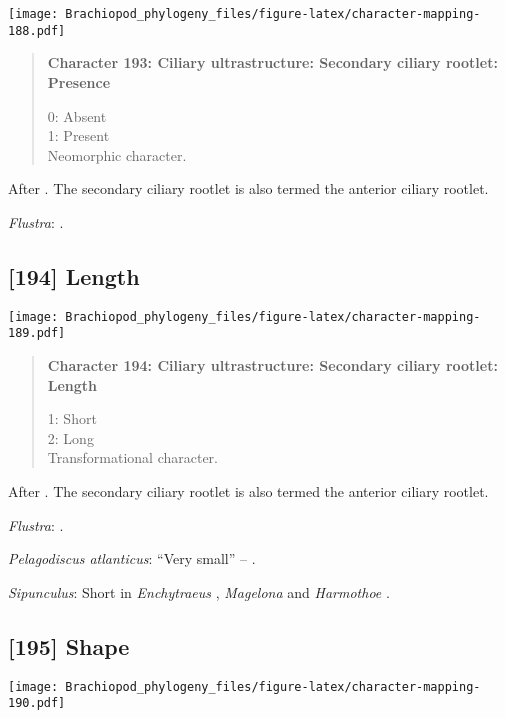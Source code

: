 \documentclass[openany]{book}
\theoremstyle{definition}
\theoremstyle{definition}
\theoremstyle{definition}
\theoremstyle{remark}
\begin{document}
\texttt{[image: Brachiopod\_phylogeny\_files/figure-latex/character-mapping-188.pdf]}

\begin{quote}
\textbf{Character 193: Ciliary ultrastructure: Secondary ciliary
rootlet: Presence}

0: Absent\\
1: Present\\
Neomorphic character.
\end{quote}

After \citet{Lundin2009}. The secondary ciliary rootlet is also termed
the anterior ciliary rootlet.

\hypertarget{Flustra-coding-193}{}
\emph{Flustra}: \citet{Reed1982}.

\subsection*{{[}194{]} Length}\label{length-1}

\texttt{[image: Brachiopod\_phylogeny\_files/figure-latex/character-mapping-189.pdf]}

\begin{quote}
\textbf{Character 194: Ciliary ultrastructure: Secondary ciliary
rootlet: Length}

1: Short\\
2: Long\\
Transformational character.
\end{quote}

After \citet{Lundin2009}. The secondary ciliary rootlet is also termed
the anterior ciliary rootlet.

\hypertarget{Flustra-coding-194}{}
\emph{Flustra}: \citet{Reed1982}.

\hypertarget{Pelagodiscus_atlanticus-coding-194}{}
\emph{Pelagodiscus atlanticus}: ``Very small'' -- \citet{Luter1995}.

\hypertarget{Sipunculus-coding-194}{}
\emph{Sipunculus}: Short in \emph{Enchytraeus} \citep{Reger1967},
\emph{Magelona} \citep{Bartolomaeus1995} and \emph{Harmothoe}
\citep{Holborow1969}.

\subsection*{{[}195{]} Shape}\label{shape-1}

\texttt{[image: Brachiopod\_phylogeny\_files/figure-latex/character-mapping-190.pdf]}
\end{document}
